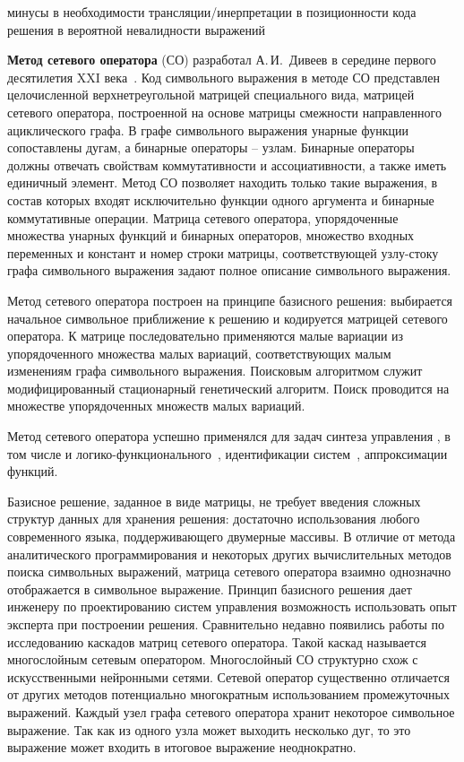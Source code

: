 минусы
в необходимости трансляции/инерпретации
в позиционности кода решения
в вероятной невалидности выражений

\textbf{Метод сетевого оператора} (СО) разработал А.\,И.~Дивеев в середине первого десятилетия XXI века~\cite{Дивеев2006}.
Код символьного выражения в методе СО представлен целочисленной верхнетреугольной матрицей специального вида, матрицей сетевого оператора, построенной на основе матрицы смежности направленного ациклического графа.
В графе символьного выражения унарные функции сопоставлены дугам, а бинарные операторы -- узлам.
Бинарные операторы должны отвечать свойствам коммутативности и ассоциативности, а также иметь единичный элемент.
Метод СО позволяет находить только такие выражения, в состав которых входят исключительно функции одного аргумента и бинарные коммутативные операции.
Матрица сетевого оператора, упорядоченные множества унарных функций и бинарных операторов, множество входных переменных и констант и номер строки матрицы, соответствующей узлу-стоку графа символьного выражения задают полное описание символьного выражения.

Метод сетевого оператора построен на принципе базисного решения: выбирается начальное символьное приближение к решению и кодируется матрицей сетевого оператора.
К матрице последовательно применяются малые вариации из упорядоченного множества малых вариаций, соответствующих малым изменениям графа символьного выражения.
Поисковым алгоритмом служит модифицированный стационарный генетический алгоритм.
Поиск проводится на множестве упорядоченных множеств малых вариаций.

Метод сетевого оператора успешно применялся для задач синтеза управления , в том числе и логико-функционального~\cite{ДивСофр2012, АтиенДивеев2012}, идентификации систем~\cite{Дивеев2008a}, аппроксимации функций.

Базисное решение, заданное в виде матрицы, не требует введения сложных структур данных для хранения решения: достаточно использования любого современного языка, поддерживающего двумерные массивы.
В отличие от метода аналитического программирования и некоторых других вычислительных методов поиска символьных выражений, матрица сетевого оператора взаимно однозначно отображается в символьное выражение.
Принцип базисного решения дает инженеру по проектированию систем управления возможность использовать опыт эксперта при построении решения.
Сравнительно недавно появились работы по исследованию каскадов матриц сетевого оператора.
Такой каскад называется многослойным сетевым оператором.
Многослойный СО структурно схож с искусственными нейронными сетями.
Сетевой оператор существенно отличается от других методов потенциально многократным использованием промежуточных выражений.
Каждый узел графа сетевого оператора хранит некоторое символьное выражение.
Так как из одного узла может выходить несколько дуг, то это выражение может входить в итоговое выражение неоднократно.

